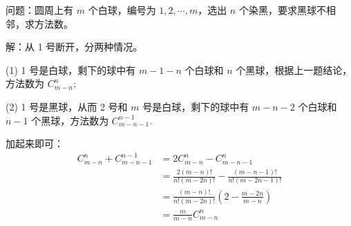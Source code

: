 \vbox{}

问题：圆周上有 $ m $ 个白球，编号为 $ 1,2,\cdots,m $，选出 $ n $ 个染黑，要求黑球不相邻，求方法数。

解：从 1 号断开，分两种情况。

(1) 1 号是白球，剩下的球中有 $ m - 1 - n $ 个白球和 $ n $ 个黑球，根据上一题结论，方法数为 $ C_{m-n}^n $;

(2) 1 号是黑球，从而 2 号和 $ m $ 号是白球，剩下的球中有 $ m - n - 2 $ 个白球和 $ n - 1 $ 个黑球，方法数为 $ C_{m-n-1}^{n-1} $.

加起来即可：
\begin{align*}
C_{m-n}^n + C_{m-n-1}^{n-1} &= 2C_{m-n}^n - C_{m-n-1}^n \\
& = \frac{2(m-n)!}{n!(m-2n)!} - \frac{(m-n-1)!}{n!(m-2n-1)!} \\
& = \frac{(m-n)!}{n!(m-2n)!}(2-\frac{m-2n}{m-n}) \\ 
& = \frac{m}{m-n} C_{m-n}^n
\end{align*}

\vbox{}

